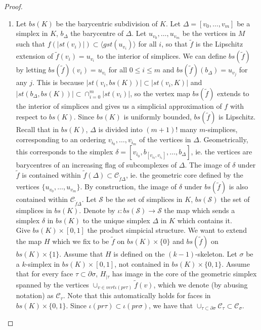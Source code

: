 \documentclass[a4paper,11pt]{article}
\theoremstyle{definition}
\theoremstyle{plain}
\theoremstyle{remark}
\begin{document}
{\begin{proof}
\begin{enumerate}
If $\tilde{f}_{|L} = \tilde{f}'_{|L}$ we can choose $H$ to fix the subcomplex $L$ by inducting only over simplices not contained in $L \times [0,1]$.

\item Let $bs(K)$ be the barycentric subdivision of $K$. Let $\Delta=[v_0,\dots,v_m]$ be a simplex in $K$, $b_{\Delta}$ the barycentre of $\Delta$. Let $u_{v_0},\dots ,u_{v_m}$ be the vertices in $M$ such that $f (|st(v_i)|) \subset \langle gst(u_{v_i})\rangle$ for all $i$, so that $\tilde{f}$ is the Lipschitz extension of $\tilde{f}(v_i) = u_{v_i}$ to the interior of simplices. We can define $bs(\tilde{f})$ by letting $bs(\tilde{f})(v_i) = u_{v_i}$ for all $0\leq i \leq m$ and $bs(\tilde{f})(b_{\Delta}) = u_{v_j}$ for any $j$. This is because $|st(v_i,bs(K))|\subset|st(v_i,K)|$ and $|st(b_{\Delta}, bs(K))| \subset \cap_{i=0}^{m} |st(v_i)|$, so the vertex map $bs(\tilde{f})$ extends to the interior of simplices and gives us a simplicial approximation of $f$ with respect to $bs(K)$. Since $bs(K)$ is uniformly bounded, $bs(\tilde{f})$ is Lipschitz.  \\

Recall that in $bs(K)$, $\Delta$ is divided into $(m+1)!$ many $m$-simplices, corresponding to an ordering $v_{i_{0}}, \dots, v_{i_{m}}$ of the vertices in $\Delta$. Geometrically, this corresponds to the simplex $\delta=[v_{i_{0}}, b_{[v_{i_{0}},v_{i_{1}}]},\dots,b_{\Delta}]$, ie. the vertices are barycentres of an increasing flag of subcomplexes of $\Delta$. The image of $\delta$ under $\tilde{f}$ is contained within $\tilde{f}(\Delta) \subset \mathscr{C}_{\tilde{f}\Delta}$, ie. the geometric core defined by the vertices $\{u_{v_0},\dots, u_{v_{m}}\}$. By construction, the image of $\delta$ under $bs(\tilde{f})$ is also contained within $\mathscr{C}_{\tilde{f}\Delta}$. Let $\mathcal{S}$ be the set of simplices in $K$, $bs(\mathcal{S})$ the set of simplices in $bs(K)$. Denote by $\iota: bs(\mathcal{S})\rightarrow \mathcal{S}$ the map which sends a simplex $\delta$ in $bs(K)$ to the unique simplex $\Delta$ in $K$ which contains it.\\

Give $bs(K) \times [0,1]$ the product simpicial structure. We want to extend the map $H$ which we fix to be $\tilde{f}$ on $bs(K) \times \{0\}$ and $bs(\tilde{f})$ on $bs(K) \times \{1\}$.  Assume that $H$ is defined on the $(k-1)$-skeleton. Let $\sigma$ be a $k$-simplex in $bs(K) \times [0,1]$, not contained in $bs(K) \times \{0,1\}$. Assume that for every face $\tau \subset \partial \sigma$, $H_{|\tau}$ has image in the core of the geometric simplex spanned by the vertices $\cup_{v \in vert \iota(pr \tau)} \tilde{f}(v)$, which we denote (by abusing notation) as $\mathscr{C}_{\tau}$. Note that this automatically holds for faces in $bs(K) \times \{0,1\}$. Since $\iota (pr \tau) \subset \iota (pr \sigma)$, we have that $\cup_{\tau \subset \partial \sigma} \mathscr{C}_{\tau} \subset \mathscr{C}_{\sigma}$.\\ 


\end{enumerate}
\end{proof}}
\end{document}
